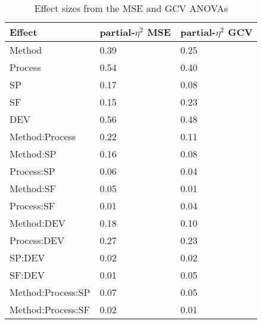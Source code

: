 \documentclass[man, floatsintext]{apa7}
\begin{document}
\begin{table}[tbp] %

  \begin{center}
    \begin{threeparttable}
      \caption{Effect sizes from the MSE and GCV ANOVAs}
      \label{tab:peta}
      \begin{tabular}{lll}
        \toprule
        Effect                & \multicolumn{1}{c}{partial-$\eta^2$ MSE} &
        \multicolumn{1}{c}{partial-$\eta^2$ GCV}
        \\
        \midrule
        Method                & 0.39                                     & 0.25
        \\
        Process               & 0.54                                     & 0.40
        \\
        SP                    & 0.17                                     & 0.08
        \\
        SF                    & 0.15                                     & 0.23
        \\
        DEV                   & 0.56                                     & 0.48
        \\
        Method:Process        & 0.22                                     & 0.11
        \\
        Method:SP             & 0.16                                     & 0.08
        \\
        Process:SP            & 0.06                                     & 0.04
        \\
        Method:SF             & 0.05                                     & 0.01
        \\
        Process:SF            & 0.01                                     & 0.04
        \\
        Method:DEV            & 0.18                                     & 0.10
        \\
        Process:DEV           & 0.27                                     & 0.23
        \\
        SP:DEV                & 0.02                                     & 0.02
        \\
        SF:DEV                & 0.01                                     & 0.05
        \\
        Method:Process:SP     & 0.07                                     & 0.05
        \\
        Method:Process:SF     & 0.02                                     & 0.01

\end{tabular}
\end{threeparttable}
\end{center}
\end{table}
\end{document}
